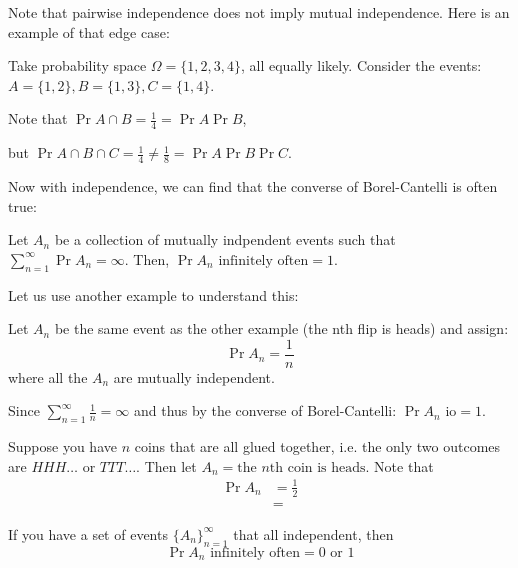 Note that pairwise independence does not imply mutual independence. Here is
an example of that edge case:

\begin{example}
    Take probability space $\Omega = \{1, 2, 3, 4\}$, all equally likely. Consider the events:
    $A = \{1, 2\}, B = \{1, 3\}, C=\{1,4\}$.

    Note that $\Pr{A \cap B} = \frac{1}{4} = \Pr{A} \Pr{B}$, 
    
    but
    $\Pr{A \cap B \cap C} = \frac{1}{4} \neq \frac{1}{8} = \Pr{A} \Pr{B} \Pr{C}$.
\end{example}

Now with independence, we can find that the converse of Borel-Cantelli is often true:

\begin{theorem} 
    Let $A_n$ be a collection of mutually indpendent events such that
    $\sum_{n = 1}^{\infty} \Pr{A_n} = \infty$. Then, $\Pr{A_n \text{ infinitely often}} = 1$.
\end{theorem}

Let us use another example to understand this:

\begin{example}
    Let $A_n$ be the same event as the other example (the nth flip is heads) and assign:
    \[ \Pr{A_n} = \frac{1}{n} \]
    where all the $A_n$ are mutually independent.

    Since $\sum_{n = 1}^{\infty} \frac{1}{n} = \infty$ and thus by the converse of Borel-Cantelli:
    $\Pr{A_n \text{ io}} = 1$.
\end{example}

\begin{example}
    Suppose you have $n$ coins that are all glued together, i.e. the only two outcomes
    are $HHH\dots$ or $TTT\dots$. Then let $A_n = {\text{the $n$th coin is heads}}$. Note that
    \begin{align*}
        \Pr{A_n} &= \frac{1}{2} \\
        &=
    \end{align*}
\end{example}

\begin{theorem}
    If you have a set of events $\{A_n\}_{n = 1}^{\infty}$ that all independent,
    then
    \[ \Pr{A_n \text{ infinitely often}} = 0 \text{ or } 1 \]
\end{theorem}

